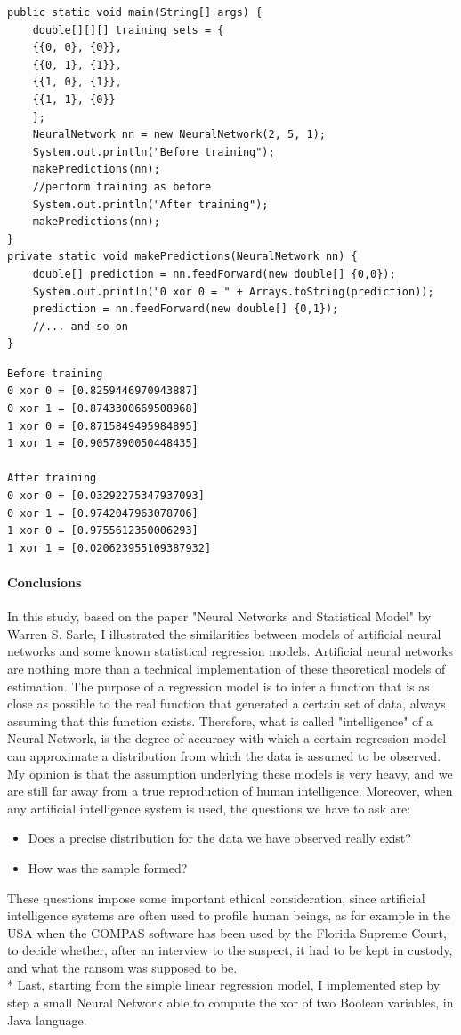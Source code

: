 \documentclass[10pt,a4paper]{article}
\begin{document}
\begin{lstlisting}
public static void main(String[] args) {
	double[][][] training_sets = {
	{{0, 0}, {0}},
	{{0, 1}, {1}},
	{{1, 0}, {1}},
	{{1, 1}, {0}}
	};
	NeuralNetwork nn = new NeuralNetwork(2, 5, 1);
	System.out.println("Before training");
	makePredictions(nn);
	//perform training as before
	System.out.println("After training");
	makePredictions(nn);
}
private static void makePredictions(NeuralNetwork nn) {
	double[] prediction = nn.feedForward(new double[] {0,0});
	System.out.println("0 xor 0 = " + Arrays.toString(prediction));
	prediction = nn.feedForward(new double[] {0,1});
	//... and so on
}
\end{lstlisting}
\begin{lstlisting}
Before training
0 xor 0 = [0.8259446970943887]
0 xor 1 = [0.8743300669508968]
1 xor 0 = [0.8715849495984895]
1 xor 1 = [0.9057890050448435]

After training
0 xor 0 = [0.03292275347937093]
0 xor 1 = [0.9742047963078706]
1 xor 0 = [0.9755612350006293]
1 xor 1 = [0.020623955109387932]
\end{lstlisting}
\paragraph{Conclusions}
In this study, based on the paper "Neural Networks and Statistical Model" by Warren S. Sarle, I illustrated the similarities between models of artificial neural networks and some known statistical regression models. Artificial neural networks are nothing more than a technical implementation of these theoretical models of estimation. The purpose of a regression model is to infer a function that is as close as possible to the real function that generated a certain set of data, always assuming that this function exists. Therefore, what is called "intelligence" of a Neural Network, is the degree of accuracy with which a certain regression model can approximate a distribution from which the data is assumed to be observed. My opinion is that the assumption underlying these models is very heavy, and we are still far away from a true reproduction of human intelligence. Moreover, when any artificial intelligence system is used, the questions we have to ask are:
\begin{itemize}
	\item Does a precise distribution for the data we have observed really exist?
	\item How was the sample formed?
\end{itemize}
These questions impose some important ethical consideration, since artificial intelligence systems are often used to profile human beings, as for example in the USA when the COMPAS software has been used by the Florida Supreme Court, to decide whether, after an interview to the suspect, it had to be kept in custody, and what the ransom was supposed to be.\\* Last, starting from the simple linear regression model, I implemented step by step a small Neural Network able to compute the xor of two Boolean variables, in Java language.
\end{document}
